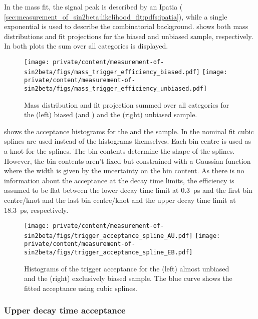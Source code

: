 In the mass fit, the signal peak is described by an Ipatia \PDF (\cf
\cref{sec:measurement_of_sin2beta:likelihood_fit:pdfs:ipatia}), while a single
exponential is used to describe the combinatorial background.
shows both mass distributions and fit projections for the biased and unbiased
sample, respectively. In both plots the sum over all categories is displayed.
%
\begin{figure}
\texttt{[image: private/content/measurement-of-sin2beta/figs/mass\_trigger\_efficiency\_biased.pdf]}
\texttt{[image: private/content/measurement-of-sin2beta/figs/mass\_trigger\_efficiency\_unbiased.pdf]}
\caption{Mass distribution and fit projection summed over all categories for
the (left) biased (\catAU and \catEB) and the (right) unbiased sample.}
\label{fig:measurement_of_sin2beta:resolution_and_acceptance:acceptance:lower:mass_fits}
\end{figure}
%
shows the acceptance histograms for the \catAU and the \catEB sample. In the
nominal fit cubic splines \cite{Karbach:2014qba} are used instead of the
histograms themselves. Each bin centre is used as a knot for the splines. The
bin contents determine the shape of the splines. However, the bin contents
aren't fixed but constrained with a Gaussian function where the width is given
by the uncertainty on the bin content. As there is no information about the
acceptance at the decay time limits, the efficiency is assumed to be flat
between the lower decay time limit at \SI{0.3}{\ps} and the first bin
centre/knot and the last bin centre/knot and the upper decay time limit at
\SI{18.3}{\ps}, respectively.
%
\begin{figure}
\texttt{[image: private/content/measurement-of-sin2beta/figs/trigger\_acceptance\_spline\_AU.pdf]}
\texttt{[image: private/content/measurement-of-sin2beta/figs/trigger\_acceptance\_spline\_EB.pdf]}
\caption{Histograms of the trigger acceptance for the (left) almost unbiased and
the (right) exclusively biased sample. The blue curve shows the fitted
acceptance using cubic splines.}
\label{fig:measurement_of_sin2beta:resolution_and_acceptance:acceptance:lower:splines}
\end{figure}

\subsubsection{Upper decay time acceptance}
\label{sec:measurement_of_sin2beta:resolution_and_acceptance:acceptance:upper}

